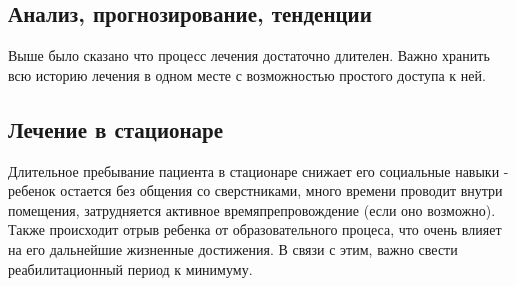 \subsection{Анализ, прогнозирование, тенденции}
Выше было сказано что процесс лечения достаточно длителен. Важно хранить всю
историю лечения в одном месте с возможностью простого доступа к ней.

\subsection{Лечение в стационаре}
Длительное пребывание пациента в стационаре снижает его социальные навыки -
ребенок остается без общения со сверстниками, много времени проводит внутри
помещения, затрудняется активное времяпрепровождение (если оно возможно). Также
происходит отрыв ребенка от образовательного процеса, что очень влияет на его
дальнейшие жизненные достижения. В связи с этим, важно свести реабилитационный
период к минимуму.
